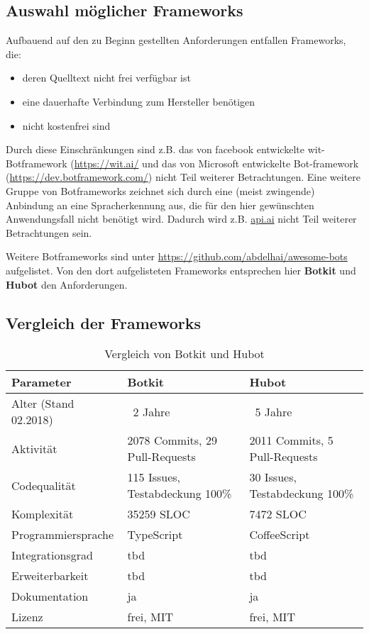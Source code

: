 \subsection{Auswahl möglicher Frameworks}

Aufbauend auf den zu Beginn gestellten Anforderungen entfallen Frameworks, die:
\begin{itemize}
    \item deren Quelltext nicht frei verfügbar ist
    \item eine dauerhafte Verbindung zum Hersteller benötigen
    \item nicht kostenfrei sind
\end{itemize}

Durch diese Einschränkungen sind z.B. das von facebook entwickelte wit-Botframework (\url{https://wit.ai/} und das von Microsoft entwickelte Bot-framework (\url{https://dev.botframework.com/}) nicht Teil weiterer Betrachtungen.
Eine weitere Gruppe von Botframeworks zeichnet sich durch eine (meist zwingende) Anbindung an eine Spracherkennung aus, die für den hier gewünschten Anwendungsfall nicht benötigt wird. Dadurch wird z.B. \url{api.ai} nicht Teil weiterer Betrachtungen sein.


Weitere Botframeworks sind unter \url{https://github.com/abdelhai/awesome-bots} aufgelistet. 
Von den dort aufgelisteten Frameworks entsprechen hier \textbf{Botkit} und \textbf{Hubot} den Anforderungen.

\subsection{Vergleich der Frameworks}

\begin{table}[htbp]
    \centering
    \begin{tabularx}{\textwidth}{lXX}
        \hline
        \textbf{Parameter} & \textbf{Botkit} & \textbf{Hubot} \\
        \hline
        Alter (Stand 02.2018) & ~2 Jahre & ~5 Jahre \\
        \hline
        Aktivität & 2078 Commits, 29 Pull-Requests & 2011 Commits, 5 Pull-Requests \\
        \hline
        Codequalität & 115 Issues, Testabdeckung 100\% & 30 Issues, Testabdeckung 100\% \\
        \hline
        Komplexität & 35259 SLOC & 7472 SLOC\\
        \hline
        Programmiersprache & TypeScript & CoffeeScript\\
        \hline
        Integrationsgrad & tbd & tbd \\
        \hline
        Erweiterbarkeit & tbd & tbd \\
        \hline
        Dokumentation & ja & ja \\
        \hline
        Lizenz & frei, MIT & frei, MIT \\
    \end{tabularx}
    \caption{Vergleich von Botkit und Hubot}
    \label{tab:comparebotkithubot}
\end{table}

